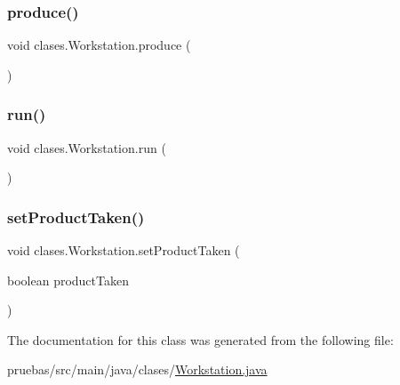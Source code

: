 \subsubsection{\texorpdfstring{produce()}{produce()}}
{\footnotesize\ttfamily void clases.\+Workstation.\+produce (\begin{DoxyParamCaption}{ }\end{DoxyParamCaption})}

\mbox{\label{classclases_1_1_workstation_a163438e5a169b92b5fccee9f794558c3}} 
\subsubsection{\texorpdfstring{run()}{run()}}
{\footnotesize\ttfamily void clases.\+Workstation.\+run (\begin{DoxyParamCaption}{ }\end{DoxyParamCaption})}

\mbox{\label{classclases_1_1_workstation_ace5b5928bee2bcbb8b4be09e8c94a7b1}} 
\subsubsection{\texorpdfstring{set\+Product\+Taken()}{setProductTaken()}}
{\footnotesize\ttfamily void clases.\+Workstation.\+set\+Product\+Taken (\begin{DoxyParamCaption}\item[{boolean}]{product\+Taken }\end{DoxyParamCaption})}



The documentation for this class was generated from the following file\+:\begin{DoxyCompactItemize}
\item 
pruebas/src/main/java/clases/\mbox{\hyperlink{_workstation_8java}{Workstation.\+java}}\end{DoxyCompactItemize}
